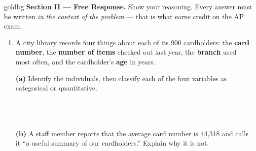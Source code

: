 \boxguard[16]
\begin{headlinebox}{goldbg}
\small
\textbf{Section II --- Free Response.} Show your reasoning. Every answer must be written
\emph{in the context of the problem} --- that is what earns credit on the AP exam.
\end{headlinebox}

\vspace{0.10in}

\begin{enumerate}[leftmargin=1.9em, itemsep=0.16in, resume]

  \boxguard[21]
  \item A city library records four things about each of its 900 cardholders: the
        \textbf{card number}, the \textbf{number of items} checked out last year, the
        \textbf{branch} used most often, and the cardholder's \textbf{age} in years.

        \boxguard[17]
        \vspace{6pt}
        \textbf{(a)} Identify the individuals, then classify each of the four variables as
        categorical or quantitative.\\[4pt]
        \\[1pt]
        \\[1pt]
        \\

        \boxguard[17]
        \vspace{6pt}
        \textbf{(b)} A staff member reports that the average card number is 44{,}318 and calls
        it ``a useful summary of our cardholders.'' Explain why it is not.\\[4pt]
        \\[1pt]
        \\


\end{enumerate}
